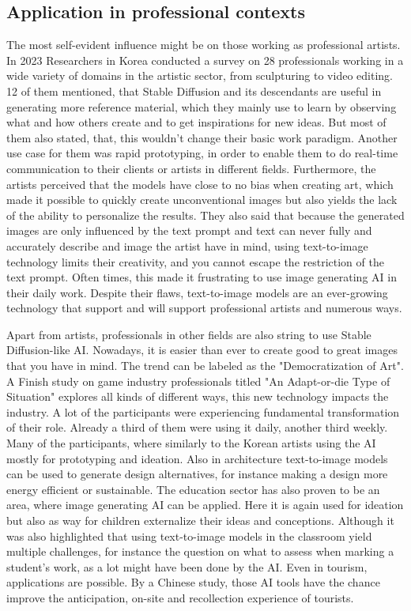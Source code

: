 \documentclass[11pt]{article}
\begin{document}
\subsection{Application in professional contexts}
The most self-evident influence might be on those working as professional artists. In 2023 Researchers in Korea conducted a survey on 28 professionals working in a wide variety of domains in the artistic sector, from sculpturing to video editing\cite{ko2023largescaletexttoimagegenartionmodelsforvisualartists}. 12 of them mentioned, that Stable Diffusion and its descendants are useful in generating more reference material, which they mainly use to learn by observing what and how others create and to get inspirations for new ideas. But most of them also stated, that, this wouldn't change their basic work paradigm. Another use case for them was rapid prototyping, in order to enable them to do real-time communication to their clients or artists in different fields. Furthermore, the artists perceived that the models have close to no bias when creating art, which made it possible to quickly create unconventional images but also yields the lack of the ability to personalize the results. They also said that because the generated images are only influenced by the text prompt and text can never fully and accurately describe and image the artist have in mind, using text-to-image technology limits their creativity, and you cannot escape the restriction of the text prompt. Often times, this made it frustrating to use image generating AI in their daily work. Despite their flaws, text-to-image models are an ever-growing technology that support and will support professional artists and numerous ways.

Apart from artists, professionals in other fields are also string to use Stable Diffusion-like AI. Nowadays, it is easier than ever to create good to great images that you have in mind. The trend can be labeled as the "Democratization of Art". A Finish study on game industry professionals\cite{vimpari2023texttoimagegenerationaibygameprofessionals} titled "An Adapt-or-die Type of Situation" explores all kinds of different ways, this new technology impacts the industry. A lot of the participants were experiencing fundamental transformation of their role. Already a third of them were using it daily, another third weekly. Many of the participants, where similarly to the Korean artists using the AI mostly for prototyping and ideation. Also in architecture\cite{sekban2022artandarchtitecture} text-to-image models can be used to generate design alternatives, for instance making a design more energy efficient or sustainable. The education sector has also proven to be an area, where image generating AI can be applied\cite{vartiainen2023aiincraftseducation}. Here it is again used for ideation but also as way for children externalize their ideas and conceptions. Although it was also highlighted that using text-to-image models in the classroom yield multiple challenges, for instance the question on what to assess when marking a student's work, as a lot might have been done by the AI. Even in tourism, applications are possible. By a Chinese study\cite{miao2023aiintourism}, those AI tools have the chance improve the anticipation, on-site and recollection experience of tourists.
\end{document}

